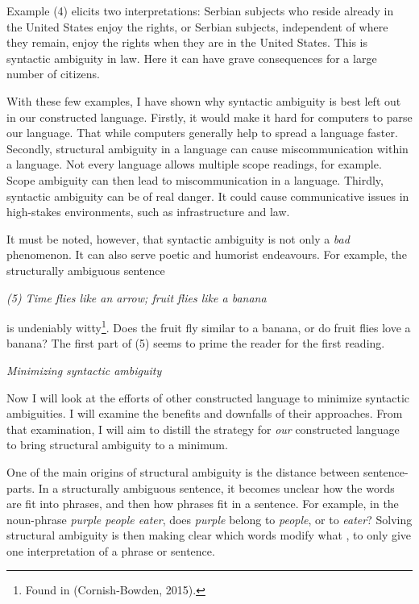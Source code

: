 \noindent Example (4) elicits two interpretations: Serbian subjects who reside already in the United States enjoy the rights, or Serbian subjects, independent of where they remain, enjoy the rights when they are in the United States. This is syntactic ambiguity in law. Here it can have grave consequences for a large number of citizens.

With these few examples, I have shown why syntactic ambiguity is best left out in our constructed language. Firstly, it would make it hard for computers to parse our language. That while computers generally help to spread a language faster. Secondly, structural ambiguity in a language can cause miscommunication within a language. Not every language allows multiple scope readings, for example. Scope ambiguity can then lead to miscommunication in a language. Thirdly, syntactic ambiguity can be of real danger. It could cause communicative issues in high-stakes environments, such as infrastructure and law.  

It must be noted, however, that syntactic ambiguity is not only a {\it bad} phenomenon. It can also serve poetic and humorist endeavours. For example, the structurally ambiguous sentence

\begin{singlespace*}
	\begin{center}
		{\it (5) Time flies like an arrow; fruit flies like a banana}
	\end{center}
\end{singlespace*}

\noindent is undeniably witty\footnote{Found  in (Cornish-Bowden, 2015).}. Does the fruit fly similar to a banana, or do fruit flies love a banana? The first part of (5) seems to prime the reader for the first reading.  

{\it Minimizing syntactic ambiguity}

\noindent Now I will look at the efforts of other constructed language to minimize syntactic ambiguities. I will examine the benefits and downfalls of their approaches. From that examination, I will aim to distill the strategy for {\it our} constructed language to bring structural ambiguity to a minimum. 

One of the main origins of structural ambiguity is the distance between sentence-parts. In a structurally ambiguous sentence, it becomes unclear how the words are fit into phrases, and then how phrases fit in a sentence. For example, in the noun-phrase {\it purple people eater}, does {\it purple} belong to {\it people}, or to {\it eater}? Solving structural ambiguity is then making clear which words modify what , to only give one interpretation of a phrase or sentence.

